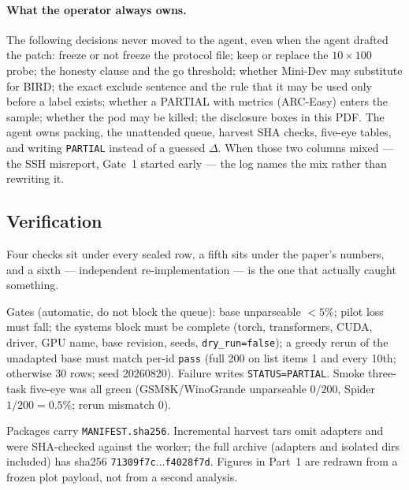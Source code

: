 \paragraph{What the operator always owns.}
The following decisions never moved to the agent, even when the
agent drafted the patch: freeze or not freeze the protocol file;
keep or replace the $10{\times}100$ probe; the honesty clause and
the go threshold; whether Mini-Dev may substitute for BIRD; the
exact exclude sentence and the rule that it may be used only
before a label exists; whether a PARTIAL with metrics (ARC-Easy)
enters the sample; whether the pod may be killed; the disclosure
boxes in this PDF.
The agent owns packing, the unattended queue, harvest SHA checks,
five-eye tables, and writing \texttt{PARTIAL} instead of a guessed
$\Delta$. When those two columns mixed --- the SSH misreport, Gate~1
started early --- the log names the mix rather than rewriting it.

\subsection{Verification}
\label{p2:verify}
Four checks sit under every sealed row, a fifth sits under the
paper's numbers, and a sixth --- independent re-implementation ---
is the one that actually caught something.

Gates (automatic, do not block the queue): base unparseable
$<5\%$; pilot loss must fall; the systems block must be complete
(torch, transformers, CUDA, driver, GPU name, base revision,
seeds, \texttt{dry\_run=false}); a greedy rerun of the unadapted
base must match per-id \texttt{pass} (full 200 on list items 1 and
every 10th; otherwise 30 rows; seed 20260820). Failure writes
\texttt{STATUS=PARTIAL}.
Smoke three-task five-eye was all green (GSM8K/WinoGrande
unparseable $0/200$, Spider $1/200=0.5\%$; rerun mismatch 0).

Packages carry \texttt{MANIFEST.sha256}. Incremental harvest tars
omit adapters and were SHA-checked against the worker; the full
archive (adapters and isolated dirs included) has sha256
\texttt{71309f7c}$\ldots$\texttt{f4028f7d}.
Figures in Part~1 are redrawn from a frozen plot payload, not from
a second analysis.

